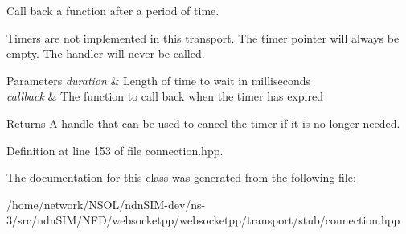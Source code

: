Call back a function after a period of time. 

Timers are not implemented in this transport. The timer pointer will always be empty. The handler will never be called.


\begin{DoxyParams}{Parameters}
{\em duration} & Length of time to wait in milliseconds \\
\hline
{\em callback} & The function to call back when the timer has expired \\
\hline
\end{DoxyParams}
\begin{DoxyReturn}{Returns}
A handle that can be used to cancel the timer if it is no longer needed. 
\end{DoxyReturn}


Definition at line 153 of file connection.\+hpp.



The documentation for this class was generated from the following file\+:\begin{DoxyCompactItemize}
\item 
/home/network/\+N\+S\+O\+L/ndn\+S\+I\+M-\/dev/ns-\/3/src/ndn\+S\+I\+M/\+N\+F\+D/websocketpp/websocketpp/transport/stub/connection.\+hpp\end{DoxyCompactItemize}
